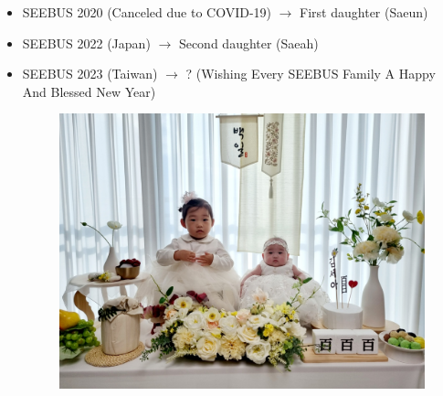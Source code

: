 \documentclass[9pt]{beamer}
\newcounter{frame}[frame]
\begin{document}
\begin{frame}
\small
\begin{itemize}
	\item SEEBUS 2020 (Canceled due to COVID-19) $\rightarrow$ First daughter (Saeun)
	\item SEEBUS 2022 (Japan) $\rightarrow$ Second daughter (Saeah)
	\item SEEBUS 2023 (Taiwan) $\rightarrow$ ? (Wishing Every SEEBUS Family A Happy And Blessed New Year)
\begin{figure}
	\includegraphics[height=.7\textheight]{KakaoTalk_20221203_210329893}
\end{figure}
\end{itemize}
\end{frame}
\endgroup
\end{document}
